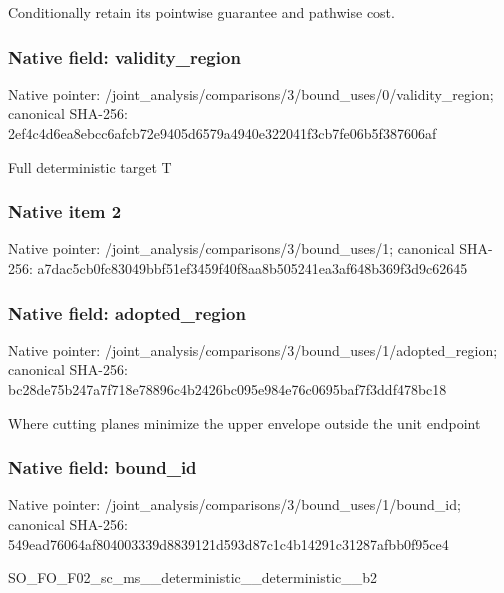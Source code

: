 \documentclass[10pt,a4paper]{article}
\begin{document}
\begingroup\raggedright\sloppy Conditionally retain its pointwise guarantee and pathwise cost.\par\endgroup

\subsubsection{Native field: validity\_\allowbreak{}region}
Native pointer: /joint\_\allowbreak{}analysis/comparisons/3/bound\_\allowbreak{}uses/0/validity\_\allowbreak{}region; canonical SHA-256: 2ef4c4d6ea8ebcc6afcb72e9405d6579a4940e322041f3cb7fe06b5f387606af

\begingroup\raggedright\sloppy Full deterministic target T\par\endgroup

\subsubsection{Native item 2}
Native pointer: /joint\_\allowbreak{}analysis/comparisons/3/bound\_\allowbreak{}uses/1; canonical SHA-256: a7dac5cb0fc83049bbf51ef3459f40f8aa8b505241ea3af648b369f3d9c62645

\subsubsection{Native field: adopted\_\allowbreak{}region}
Native pointer: /joint\_\allowbreak{}analysis/comparisons/3/bound\_\allowbreak{}uses/1/adopted\_\allowbreak{}region; canonical SHA-256: bc28de75b247a7f718e78896c4b2426bc095e984e76c0695baf7f3ddf478bc18

\begingroup\raggedright\sloppy Where cutting planes minimize the upper envelope outside the unit endpoint\par\endgroup

\subsubsection{Native field: bound\_\allowbreak{}id}
Native pointer: /joint\_\allowbreak{}analysis/comparisons/3/bound\_\allowbreak{}uses/1/bound\_\allowbreak{}id; canonical SHA-256: 549ead76064af804003339d8839121d593d87c1c4b14291c31287afbb0f95ce4

\begingroup\raggedright\sloppy SO\_\allowbreak{}FO\_\allowbreak{}F02\_\allowbreak{}sc\_\allowbreak{}ms\_\allowbreak{}\_\allowbreak{}deterministic\_\allowbreak{}\_\allowbreak{}deterministic\_\allowbreak{}\_\allowbreak{}b2\par\endgroup
\end{document}
